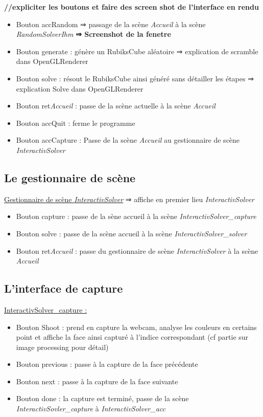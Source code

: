 \textbf{//expliciter les boutons et faire des screen shot de l’interface en rendu}
\begin{itemize}
    \item Bouton accRandom 
    ⇒ passage de la scène \textit{Accueil} à la scène \textit{RandomSolverIhm}
    \textbf{⇒ Screenshot de la fenetre}

    \item Bouton generate : génère un RubiksCube aléatoire
        ⇒ explication de scramble dans OpenGLRenderer

    \item Bouton solve : résout le RubiksCube ainsi généré sans détailler les étapes
        ⇒ explication Solve dans OpenGLRenderer

    \item Bouton ret\textit{Accueil} : passe de la scène actuelle à la scène \textit{Accueil}

    \item Bouton accQuit : ferme le programme

    \item Bouton accCapture : Passe de la scène \textit{Accueil} au gestionnaire de scène \textit{InteractivSolver}

\end{itemize}

\subsection{Le gestionnaire de scène}
\underline{Gestionnaire de scène \textit{InteractivSolver}}
⇒ affiche en premier lieu \textit{InteractivSolver}
\begin{itemize}
    \item Bouton capture : passe de la sène accueil à la scène \textit{InteractivSolver\_capture}
    \item Bouton solve : passe de la scène accueil à la scène \textit{InteractivSolver\_solver}
    \item Bouton ret\textit{Accueil} : passe du gestionnaire de scène \textit{InteractivSolver} à la scène \textit{Accueil}
\end{itemize}

\subsection{L'interface de capture}
\underline{InteractivSolver\_capture :}
\begin{itemize}
    \item Bouton Shoot : prend en capture la webcam, analyse les couleurs en certains point et affiche la face ainsi capturé à l’indice correspondant (cf partie sur image processing pour détail)
    \item Bouton previous : passe à la capture de la face précédente
    \item Bouton next : passe à la capture de la face suivante
    \item Bouton done : la capture est terminé, passe de la scène \textit{InteractivSovler\_capture} à \textit{InteractivSolver\_acc}
\end{itemize}

